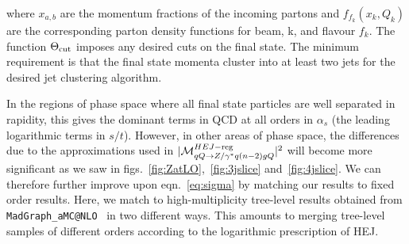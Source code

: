 	where $x_{a,b}$ are the momentum fractions of the incoming partons and
	$f_{f_k}(x_k,Q_k)$ are the corresponding parton density functions for beam,
	k, and flavour $f_k$.  The function $\Theta_{\rm cut}$ imposes any desired cuts on the final
	state.  The minimum requirement is that the final state momenta cluster into at
	least two jets for the desired jet clustering algorithm.

	In the regions of phase space where all final state particles are well separated
	in rapidity, this gives the dominant terms in QCD at all orders in $\alpha_s$  (the leading logarithmic
	terms in $s/t$).  However, in other areas of
	phase space, the differences due to the approximations used in
	$|\mathcal{M}^{HEJ-{\rm reg}}_{qQ\to Z/\gamma^* q(n-2)gQ}|^2$ will become more
	significant as we saw in figs.~\eqref{fig:ZatLO},~\eqref{fig:3jslice} and~\eqref{fig:4jslice}.
	We can therefore further improve upon eqn.~\eqref{eq:sigma} by
	matching our results to fixed order results.  Here, we match to
	high-multiplicity tree-level
	results obtained from \texttt{MadGraph\_aMC@NLO}~\cite{Alwall:2014hca} in two different ways.
	This amounts to merging tree-level samples of different orders according to the
	logarithmic prescription of HEJ.

